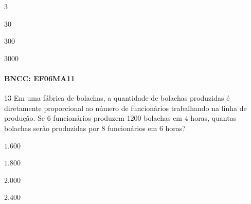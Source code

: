 {\begin{escolha}
\item $3$
\item $30$
\item $300$
\item $3000$
\end{escolha}

\paragraph{BNCC: EF06MA11}


\num{13} Em uma fábrica de bolachas, a quantidade de bolachas produzidas é
diretamente proporcional ao número de funcionários trabalhando na linha
de produção. Se $6$ funcionários produzem $1200$ bolachas em $4$ horas,
quantas bolachas serão produzidas por $8$ funcionários em $6$ horas?

\begin{escolha}
\item $1.600$ 
\item $1.800$ 
\item $2.000$ 
\item $2.400$
\end{escolha}


}
